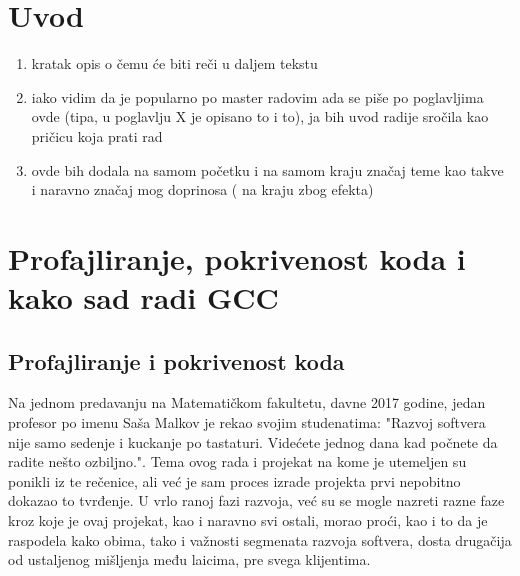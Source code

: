 \documentclass[12pt,oneside]{memoir}
\begin{document}
\frontmatter
\naslovna
\komisija
\apstrakt
\tableofcontents

\mainmatter

\chapter{Uvod}


\begin{enumerate}
\item kratak opis o čemu će biti reči u daljem tekstu
\item iako vidim da je popularno po master radovim ada se piše po poglavljima ovde (tipa, u poglavlju X je opisano to i to), ja bih uvod radije sročila kao pričicu koja prati rad
\item ovde bih dodala na samom početku i na samom kraju značaj teme kao takve i naravno značaj mog doprinosa ( na kraju zbog efekta)
\end{enumerate}


\chapter{Profajliranje, pokrivenost koda i kako sad radi GCC}
\label{chp:profajliranje}

\section{Profajliranje i pokrivenost koda}


Na jednom predavanju na Matematičkom fakultetu, davne 2017 godine, jedan profesor po imenu Saša Malkov je rekao svojim studenatima: "Razvoj softvera nije samo sedenje i kuckanje po tastaturi. Videćete jednog dana kad počnete da radite nešto ozbiljno.".
Tema ovog rada i projekat na kome je utemeljen su ponikli iz te rečenice, ali već je sam proces izrade projekta prvi nepobitno dokazao to tvrđenje. U vrlo ranoj fazi razvoja, već su se mogle nazreti razne faze kroz koje je ovaj projekat, kao i naravno svi ostali, morao proći, kao i to da je raspodela kako obima, tako i važnosti segmenata razvoja softvera, dosta drugačija od ustaljenog mišljenja među laicima, pre svega klijentima.
\end{document}
